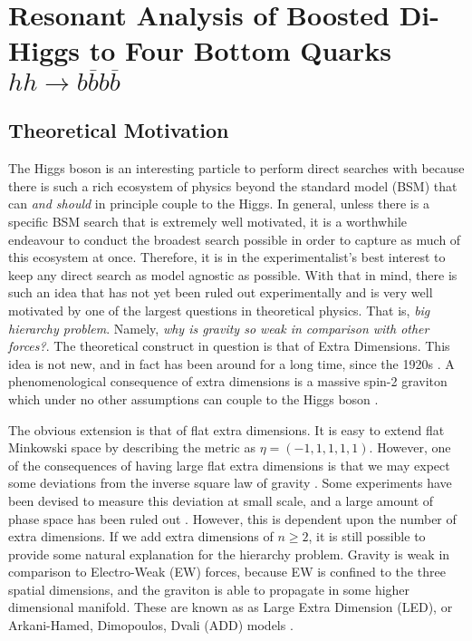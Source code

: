 \documentclass[12pt]{article}
\begin{document}
\section{Resonant Analysis of Boosted Di-Higgs to Four Bottom Quarks
$hh\rightarrow b\overline{b}b\overline{b}$}
\subsection{Theoretical Motivation}

The Higgs boson is an interesting particle to perform direct searches with
because there is such a rich ecosystem of physics beyond the standard model
(BSM) that can \textit{and should} in principle couple to the Higgs. In general,
unless there is a specific BSM search that is extremely well motivated, it is a
worthwhile endeavour to conduct the broadest search possible in order to capture
as much of this ecosystem at once. Therefore, it is in the experimentalist's
best interest to keep any direct search as model agnostic as possible. With that
in mind, there is such an idea that has not yet been ruled out experimentally
and is very well motivated by one of the largest questions in theoretical
physics. That is, \textit{big hierarchy problem}. Namely, \textit{why is gravity
so weak in comparison with other forces?}. The theoretical construct in question
is that of Extra Dimensions. This idea is not new, and in fact has been around
for a long time, since the 1920s \cite{KALUZA_2018}. A phenomenological
consequence of extra dimensions is a massive spin-2 graviton which under no
other assumptions can couple to the Higgs boson \cite{bsm}.  

The obvious extension is that of flat extra dimensions. It is easy to extend
flat Minkowski space by describing the metric as $\eta = (-1,1,1,1,1)$. However,
one of the consequences of having large flat extra dimensions is that we may
expect some deviations from the inverse square law of gravity \cite{bsm}. Some
experiments have been devised to measure this deviation at small scale, and a
large amount of phase space has been ruled out \cite{bsm}. However, this is
dependent upon the number of extra dimensions. If we add extra dimensions of
$n\geq 2$, it is still possible to provide some natural explanation for the
hierarchy problem. Gravity is weak in comparison to Electro-Weak (EW) forces,
because EW is confined to the three spatial dimensions, and the graviton is able
to propagate in some higher dimensional manifold. These are known as as Large
Extra Dimension (LED), or Arkani-Hamed, Dimopoulos, Dvali (ADD) models
\cite{Arkani_Hamed_1998, Arkani_Hamed_1999}. 
\end{document}
